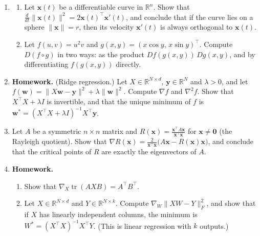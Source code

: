 \documentclass[11pt]{article}
\newcommand{\homework}{\textcolor{red!70!black}{\textbf{Homework.}}}
\newcommand{\norm}[1]{\lVert #1 \rVert}
\theoremstyle{definition}
\theoremstyle{plain}
\theoremstyle{remark}
\DeclareMathOperator{\tr}{tr}
\begin{document}
\begin{enumerate}[leftmargin=*]
\begin{enumerate}[label=(\alph*)]
        \item Show that spherical coordinates $f(r, \theta, \varphi) = (r\sin\theta\cos\varphi, \, r\sin\theta\sin\varphi, \, r\cos\theta)^\top$ have the Jacobian determinant $r^2\sin\theta$. Use the change of variables formula (Remark~\ref{rem:change-of-variables}) to show that the ball of radius $R$ has the volume $\frac{4}{3}\pi R^3$.
    \end{enumerate}
    \item \begin{enumerate}[label=(\alph*)]
        \item Let $\mathbf{x}(t)$ be a differentiable curve in $\mathbb{R}^n$. Show that $\frac{d}{dt}\norm{\mathbf{x}(t)}^2 = 2\mathbf{x}(t)^\top\mathbf{x}'(t)$, and conclude that if the curve lies on a sphere $\norm{\mathbf{x}} = r$, then its velocity $\mathbf{x}'(t)$ is always orthogonal to $\mathbf{x}(t)$.
        \item Let $f(u, v) = u^2 v$ and $g(x, y) = (x\cos y, \, x\sin y)^\top$. Compute $D(f \circ g)$ in two ways: as the product $Df(g(x, y))\,Dg(x, y)$, and by differentiating $f(g(x, y))$ directly.
    \end{enumerate}
    \item \homework{} (Ridge regression.) Let $X \in \mathbb{R}^{N \times d}$, $\mathbf{y} \in \mathbb{R}^N$ and $\lambda > 0$, and let $f(\mathbf{w}) = \norm{X\mathbf{w} - \mathbf{y}}^2 + \lambda\norm{\mathbf{w}}^2$. Compute $\nabla f$ and $\nabla^2 f$. Show that $X^\top X + \lambda I$ is invertible, and that the unique minimum of $f$ is $\mathbf{w}^* = (X^\top X + \lambda I)^{-1}X^\top\mathbf{y}$.
    \item Let $A$ be a symmetric $n \times n$ matrix and $R(\mathbf{x}) = \frac{\mathbf{x}^\top A\mathbf{x}}{\mathbf{x}^\top\mathbf{x}}$ for $\mathbf{x} \neq \mathbf{0}$ (the Rayleigh quotient). Show that $\nabla R(\mathbf{x}) = \frac{2}{\mathbf{x}^\top\mathbf{x}}\big(A\mathbf{x} - R(\mathbf{x})\mathbf{x}\big)$, and conclude that the critical points of $R$ are exactly the eigenvectors of $A$.
    \item \homework{} \begin{enumerate}[label=(\alph*)]
        \item Show that $\nabla_X\tr(AXB) = A^\top B^\top$.
        \item Let $X \in \mathbb{R}^{N \times d}$ and $Y \in \mathbb{R}^{N \times k}$. Compute $\nabla_W\norm{XW - Y}_F^2$, and show that if $X$ has linearly independent columns, the minimum is $W^* = (X^\top X)^{-1}X^\top Y$. (This is linear regression with $k$ outputs.)

\end{enumerate}
\end{enumerate}
\end{document}
